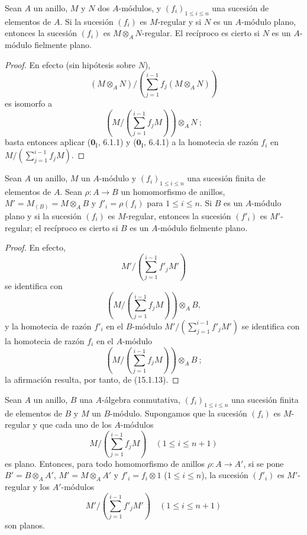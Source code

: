 \begin{proposition}[15.1.13]
\label{0.15.1.13-es}
Sean $A$ un anillo, $M$ y $N$ dos $A$-módulos, y
$(f_i)_{1\leq i\leq n}$ una sucesión de elementos de $A$. Si la sucesión
$(f_i)$ es $M$-regular y si $N$ es un $A$-módulo plano, entonces la sucesión
$(f_i)$ es $M\otimes_A N$-regular. El recíproco es cierto si $N$ es un
$A$-módulo fielmente plano.
\end{proposition}

\begin{proof}
En efecto (sin hipótesis sobre $N$),
\[
  (M\otimes_A N)/
  \left(\sum_{j=1}^{i-1}f_j(M\otimes_A N)\right)
\]
es isomorfo a
\[
  \left(M/\left(\sum_{j=1}^{i-1}f_jM\right)\right)\otimes_A N~;
\]
basta entonces aplicar ($\mathbf{0}_{\mathrm I}$, 6.1.1) y
($\mathbf{0}_{\mathrm I}$, 6.4.1) a la homotecia de razón $f_i$ en
$M/(\sum_{j=1}^{i-1}f_jM)$.
\end{proof}

\begin{corollary}[15.1.14]
\label{0.15.1.14-es}
Sean $A$ un anillo, $M$ un $A$-módulo y $(f_i)_{1\leq i\leq n}$ una sucesión
finita de elementos de $A$. Sean $\rho:A\to B$ un homomorfismo de anillos,
$M'=M_{(B)}=M\otimes_A B$ y $f'_i=\rho(f_i)$ para $1\leq i\leq n$. Si $B$ es
un $A$-módulo plano y si la sucesión $(f_i)$ es $M$-regular, entonces la
sucesión $(f'_i)$ es $M'$-regular; el recíproco es cierto si $B$ es un
$A$-módulo fielmente plano.
\end{corollary}

\begin{proof}
En efecto,
\[
  M'/\left(\sum_{j=1}^{i-1}f'_jM'\right)
\]
se identifica con
\[
  \left(M/\left(\sum_{j=1}^{i-1}f_jM\right)\right)\otimes_A B,
\]
y la homotecia de razón $f'_i$ en el $B$-módulo
$M'/(\sum_{j=1}^{i-1}f'_jM')$ se identifica con la homotecia de razón $f_i$
en el $A$-módulo
\[
  \left(M/\left(\sum_{j=1}^{i-1}f_jM\right)\right)\otimes_A B~;
\]
la afirmación resulta, por tanto, de (15.1.13).
\end{proof}

\begin{proposition}[15.1.15]
\label{0.15.1.15-es}
Sean $A$ un anillo, $B$ una $A$-álgebra conmutativa,
$(f_i)_{1\leq i\leq n}$ una sucesión finita de elementos de $B$ y $M$ un
$B$-módulo. Supongamos que la sucesión $(f_i)$ es $M$-regular y que cada uno
de los $A$-módulos
\[
  M/\left(\sum_{j=1}^{i-1}f_jM\right)\quad(1\leq i\leq n+1)
\]
es plano. Entonces, para todo homomorfismo de anillos $\rho:A\to A'$, si se
pone $B'=B\otimes_A A'$, $M'=M\otimes_A A'$ y $f'_i=f_i\otimes1$
\textup{($1\leq i\leq n$)}, la sucesión $(f'_i)$ es $M'$-regular y los
$A'$-módulos
\[
  M'/\left(\sum_{j=1}^{i-1}f'_jM'\right)\quad(1\leq i\leq n+1)
\]
son planos.
\end{proposition}

